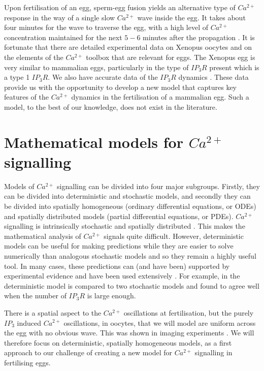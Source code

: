 {Upon fertilisation of an egg, sperm-egg fusion yields an alternative type of $Ca^{2+}$ response in the way of a single slow $Ca^{2+}$ wave inside the egg. It takes about four minutes for the wave to traverse the egg, with a high level of $Ca^{2+}$ concentration maintained for the next $5-6$ minutes after the propagation \cite{fontanilla}. It is fortunate that there are detailed experimental data on Xenopus oocytes and on the elements of the $Ca^{2+}$ toolbox that are relevant for eggs. The Xenopus egg is very similar to mammalian eggs, particularly in the type of $IP_3R$ present which is a type 1 $IP_3R$. We also have accurate data of the $IP_3R$ dynamics \cite{Mak1998}. These data provide us with the opportunity to develop a new model that captures key features of the $Ca^{2+}$ dynamics in the fertilisation of a mammalian egg. Such a model, to the best of our knowledge, does not exist in the literature.

\section{Mathematical models for $Ca^{2+}$ signalling}

Models of $Ca^{2+}$ signalling can be divided into four major subgroups.  Firstly, they can be divided into deterministic and stochastic models, and secondly they can be divided into spatially homogeneous (ordinary differential equations, or ODEs) and spatially distributed models (partial differential equations, or PDEs). $Ca^{2+}$ signalling is intrinsically stochastic and spatially distributed . This makes the mathematical analysis of $Ca^{2+}$ signals quite difficult. However, deterministic models can be useful for making predictions while they are easier to solve numerically than analogous stochastic models and so they remain a highly useful tool. In many cases, these predictions can (and have been) supported by experimental evidence and have been used extensively \cite{atri,deyoungkeizer,dupont1998}. For example, in  the deterministic  model is compared to two stochastic models and found to agree well when the number of $IP_3R$ is large enough.

There is a spatial aspect to the $Ca^{2+}$ oscillations at fertilisation, but the purely $IP_3$ induced $Ca^{2+}$ oscillations, in oocytes, that we will model are uniform across the egg with no obvious wave. This was shown in imaging experiments . We will therefore focus on deterministic, spatially homogeneous models, as a first approach to our challenge of creating a new model for $Ca^{2+}$ signalling in fertilising eggs. 

}
